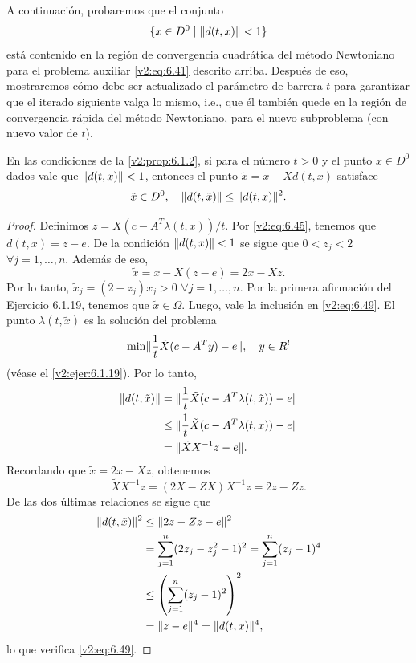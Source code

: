A continuación, probaremos que el conjunto
\[
    \{ x \in D^0 \mid \lVert d(t, x)\rVert < 1 \}
\]
está contenido en la región de convergencia cuadrática del método Newtoniano para el problema auxiliar \eqref{v2:eq:6.41} descrito arriba. Después de eso, mostraremos cómo debe ser actualizado el parámetro de barrera $t$ para garantizar que el iterado siguiente valga lo mismo, i.e., que él también quede en la región de convergencia rápida del método Newtoniano, para el nuevo subproblema (con nuevo valor de $t$).

\begin{proposition}\label{v2:prop:6.1.3}
    En las condiciones de la \cref{v2:prop:6.1.2}, si para el número $t > 0$ y el punto $x \in D^0$ dados vale que $\lVert d(t, x)\rVert < 1$, entonces el punto $\tilde{x} = x - Xd(t, x)$ satisface
    \begin{equation}
        \tilde{x} \in D^0, \quad \lVert d(t, \tilde{x})\rVert \le \lVert d(t, x)\rVert^2.
        \label{v2:eq:6.49}
    \end{equation}
\end{proposition}

\begin{proof}
    Definimos $z = X(c - A^T \lambda(t, x))/t$. Por \eqref{v2:eq:6.45}, tenemos que $d(t, x) = z - e$. De la condición $\lVert d(t, x)\rVert < 1$ se sigue que $0 < z_j < 2$ $\forall j = 1, \dots, n$. Además de eso,
    \[
        \tilde{x} = x - X(z - e) = 2x - Xz.
    \]
    Por lo tanto, $\tilde{x}_j = (2 - z_j) x_j > 0$ $\forall j = 1, \dots, n$. Por la primera afirmación del Ejercicio 6.1.19, tenemos que $\tilde{x} \in \Omega$. Luego, vale la inclusión en \eqref{v2:eq:6.49}. El punto $\lambda(t, \tilde{x})$ es la solución del problema
    \[
        \min \lVert\frac{1}{t} \tilde{X}(c - A^T y) - e\rVert, \quad y \in R^l
    \]
    (véase el \cref{v2:ejer:6.1.19}). Por lo tanto,
    \begin{align*}
        \lVert d(t, \tilde{x})\rVert &= \lVert\frac{1}{t} \tilde{X}(c - A^T \lambda(t, \tilde{x})) - e\rVert \\
        &\le \lVert\frac{1}{t} \tilde{X}(c - A^T \lambda(t, x)) - e\rVert \\
        &= \lVert\tilde{X} X^{-1} z - e\rVert.
    \end{align*}
    Recordando que $\tilde{x} = 2x - Xz$, obtenemos
    \[
        \tilde{X} X^{-1} z = (2X - ZX) X^{-1} z = 2z - Zz.
    \]
    De las dos últimas relaciones se sigue que
    \begin{align*}
        \lVert d(t, \tilde{x})\rVert^2 &\le \lVert2z - Zz - e\rVert^2 \\
        &= \sum_{j=1}^n (2z_j - z_j^2 - 1)^2 = \sum_{j=1}^n (z_j - 1)^4 \\
        &\le \left( \sum_{j=1}^n (z_j - 1)^2 \right)^2 \\
        &= \lVert z - e\rVert^4 = \lVert d(t, x)\rVert^4,
    \end{align*}
    lo que verifica \eqref{v2:eq:6.49}.
\end{proof}

